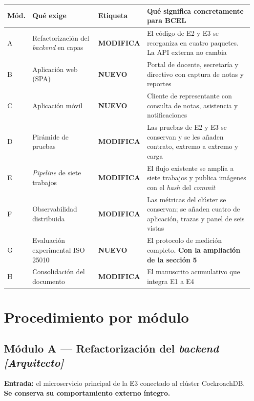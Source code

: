 \documentclass[11pt,a4paper]{article}
\newcommand{\cambia}{\cellcolor{filaCambia}\textbf{MODIFICA}}
\newcommand{\nuevo}{\cellcolor{filaNuevo}\textbf{NUEVO}}
\begin{document}
\begin{center}
	\footnotesize
	\begin{longtable}{@{}p{1.0cm}p{3.5cm}p{1.6cm}p{9.0cm}@{}}
		\toprule
		\textbf{Mód.} & \textbf{Qué exige} & \textbf{Etiqueta} & \textbf{Qué significa concretamente para BCEL} \\
		\midrule
		\endhead
		A & Refactorización del \emph{backend} en capas & \cambia & El código de E2 y E3 se reorganiza en cuatro paquetes. La API externa no cambia \\
		\addlinespace
		B & Aplicación web (SPA) & \nuevo & Portal de docente, secretaría y directivo con captura de notas y reportes \\
		\addlinespace
		C & Aplicación móvil & \nuevo & Cliente de representante con consulta de notas, asistencia y notificaciones \\
		\addlinespace
		D & Pirámide de pruebas & \cambia & Las pruebas de E2 y E3 se conservan y se les añaden contrato, extremo a extremo y carga \\
		\addlinespace
		E & \emph{Pipeline} de siete trabajos & \cambia & El flujo existente se amplía a siete trabajos y publica imágenes con el \emph{hash} del \emph{commit} \\
		\addlinespace
		F & Observabilidad distribuida & \cambia & Las métricas del clúster se conservan; se añaden cuatro de aplicación, trazas y panel de seis vistas \\
		\addlinespace
		G & Evaluación experimental ISO 25010 & \nuevo & El protocolo de medición completo. \textbf{Con la ampliación de la sección 5} \\
		\addlinespace
		H & Consolidación del documento & \cambia & El manuscrito acumulativo que integra E1 a E4 \\
		\bottomrule
	\end{longtable}
\end{center}

\section{Procedimiento por módulo}

\subsection{Módulo A --- Refactorización del \emph{backend} \emph{[Arquitecto]}}

\textbf{Entrada:} el microservicio principal de la E3 conectado al clúster CockroachDB. \textbf{Se conserva su comportamiento externo íntegro.}
\end{document}
